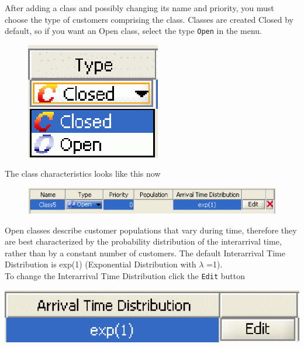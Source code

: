 After adding a class and possibly changing its name and priority,
you must choose the type of customers comprising the class.
Classes are created Closed by default, so if you want an Open
class, select the type \texttt{Open} in the menu.
\begin{figure}[h!]
\begin{center}
\includegraphics[scale=.5]{img/jsim/type_class.eps}
\end{center}
\end{figure}
The class characteristics looks like this now
\begin{figure}[h!]
\begin{center}
\includegraphics[scale=.5]{img/jsim/open_class1.eps}
\end{center}
\end{figure}

Open classes describe customer populations that vary during time,
therefore they are best characterized by the probability
distribution of the interarrival time, rather than by a constant
number of customers. The default Interarrival Time Distribution is
exp(1) (Exponential Distribution with $\lambda$ =1).\\ To change
the Interarrival Time Distribution click the \texttt{Edit} button
\begin{center}
\includegraphics[scale=.5]{img/jsim/arrival_time_distribution1.eps}
\end{center}

